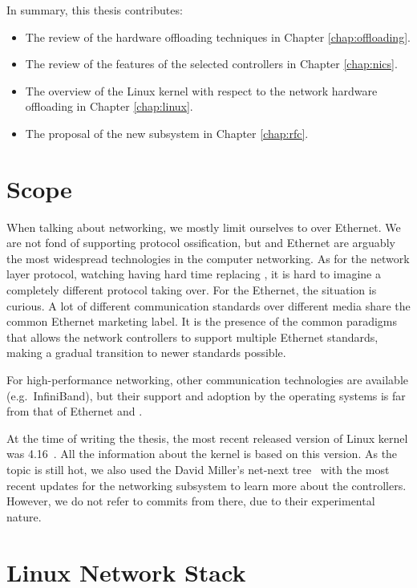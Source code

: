 In summary, this thesis contributes:
\begin{itemize}
	\item The review of the hardware offloading techniques in Chapter \ref{chap:offloading}.
	\item The review of the features of the selected controllers in Chapter \ref{chap:nics}.
	\item The overview of the Linux kernel with respect to the network hardware offloading in Chapter \ref{chap:linux}.
	\item The proposal of the new subsystem in Chapter \ref{chap:rfc}.
\end{itemize}

\section{Scope}

When talking about networking, we mostly limit ourselves to  over Ethernet.
We are not fond of supporting protocol ossification, but  and Ethernet are
arguably the most widespread technologies in the computer networking. As for the
network layer protocol, watching  having hard time replacing
, it is hard to imagine a completely different protocol taking over. For
the Ethernet, the situation is curious. A lot of different communication
standards over different media share the common Ethernet marketing label. It
is the presence of the common paradigms that allows the network controllers to support
multiple Ethernet standards, making a gradual transition to newer
standards possible.

For high-performance networking, other communication
technologies are available (e.g.\ InfiniBand), but their support and adoption by
the operating systems is far from that of Ethernet and .

At the time of writing the thesis, the most recent released version of Linux
kernel was 4.16~\cite{linux-kernel}. All the information about the kernel is
based on this version. As the topic is still hot, we also used the David
Miller's net-next tree~\cite{net-next} with the most recent updates for the networking subsystem to
learn more about the controllers. However, we do not refer to commits from
there, due to their experimental nature.

\section{Linux Network Stack}

